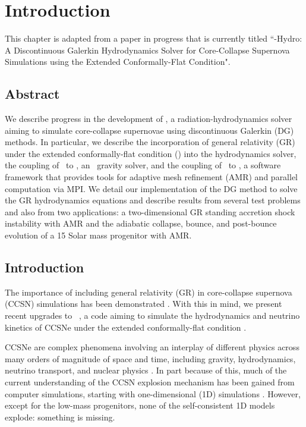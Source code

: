 \chapter{Introduction}

This chapter is adapted from
a paper in progress that is currently titled
``\thornado-Hydro: A Discontinuous Galerkin Hydrodynamics Solver for
Core-Collapse Supernova Simulations using the
Extended Conformally-Flat Condition".

\section{Abstract}

We describe progress in the development of \thornado, a radiation-hydrodynamics
solver aiming to simulate core-collapse supernovae using discontinuous Galerkin
(DG) methods.
In particular, we describe the incorporation of general relativity (GR) under
the extended conformally-flat condition (\xcfc) into the hydrodynamics solver,
the coupling of \thornado\ to \poseidon, an \xcfc\ gravity solver,
and the coupling of \thornado\ to \amrex, a software framework that provides
tools for adaptive mesh refinement (AMR) and parallel computation via MPI.
We detail our implementation of the DG method to solve the GR hydrodynamics
equations and describe results from several test problems and also from two
applications: a two-dimensional GR standing accretion shock instability with
AMR and the adiabatic collapse, bounce, and post-bounce evolution of a
15 Solar mass progenitor with AMR.

\section{Introduction}

The importance of including general relativity (GR) in core-collapse supernova
(CCSN) simulations has been demonstrated
\citep{bdm2001,mjm2012,lmm2012,oc2018}.
With this in mind, we present recent upgrades to \thornado\ \citep{pbe2021},
a code aiming to simulate the hydrodynamics and neutrino kinetics of CCSNe under
the extended conformally-flat condition \citep[\xcfc;][]{wmm1996,ccd2009}.

CCSNe are complex phenomena involving an interplay of different physics
across many orders of magnitude of space and time, including gravity,
hydrodynamics, neutrino transport, and nuclear physics
\citep[e.g., see][for reviews]{b1990,m2005,j2012,b2013,m2016,mem2020}.
In part because of this, much of the current understanding of the CCSN explosion
mechanism has been gained from computer simulations, starting with
one-dimensional (1D) simulations
\citep[e.g., see][]{%
cj1960,
mw1966,
cw1966,
r1979,
hm1981,
bw1985,
mim1991,
mb1993,
mb1993a,
mb1993b,
rj2000,
mlm2001,
rj2002,
twi2003,
tbp2003,
lmm2004,
kjh2006,
sys2007,
zwh2008,
hmj2010,
thr2017,
sro2019,
bmo2021,
gmm2023%
}.
However, except for the low-mass progenitors, none of the self-consistent 1D
models explode: something is missing.

